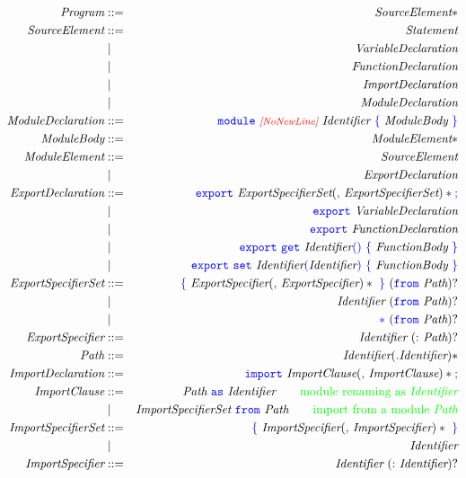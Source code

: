 \documentclass[a4paper]{article}
\newcommand{\Program}{\emph{Program}}
\newcommand{\SourceElement}{\emph{SourceElement}}
\newcommand{\Statement}{\emph{Statement}}
\newcommand{\VariableDeclaration}{\emph{VariableDeclaration}}
\newcommand{\FunctionDeclaration}{\emph{FunctionDeclaration}}
\newcommand{\ModuleDeclaration}{\emph{ModuleDeclaration}}
\newcommand{\ModuleBody}{\emph{ModuleBody}}
\newcommand{\ModuleElement}{\emph{ModuleElement}}
\newcommand{\ExportDeclaration}{\emph{ExportDeclaration}}
\newcommand{\ExportSpecifierSet}{\emph{ExportSpecifierSet}}
\newcommand{\ExportSpecifier}{\emph{ExportSpecifier}}
\newcommand{\Path}{\emph{Path}}
\newcommand{\ImportDeclaration}{\emph{ImportDeclaration}}
\newcommand{\ImportClause}{\emph{ImportClause}}
\newcommand{\ImportSpecifierSet}{\emph{ImportSpecifierSet}}
\newcommand{\ImportSpecifier}{\emph{ImportSpecifier}}
\newcommand{\FunctionBody}{\emph{FunctionBody}}
\newcommand{\Identifier}{\emph{Identifier}}
\newcommand{\NoNewLine}{\emph{\textcolor{red}{\footnotesize [NoNewLine]}}}
\newcommand{\code}[1]{\textcolor{blue}{\tt #1}}
\newcommand{\cmodule}{\code{module}}
\newcommand{\cimport}{\code{import}}
\newcommand{\cexport}{\code{export}}
\newcommand{\cget}{\code{get}}
\newcommand{\cset}{\code{set}}
\newcommand{\cfrom}{\code{from}}
\newcommand{\cas}{\code{as}}
\newcommand{\clparen}{\code{(}}
\newcommand{\crparen}{\code{)}}
\newcommand{\clbracket}{\code{\{}}
\newcommand{\crbracket}{\code{\}}}
\newcommand{\comment}[1]{\mbox{\textcolor{green}{#1}}}
\begin{document}
\begin{eqnarray*}
\Program & ::=  & \SourceElement* \\
\SourceElement & ::=  & \Statement \\
               & \mid & \VariableDeclaration \\
               & \mid & \FunctionDeclaration \\
               & \mid & \ImportDeclaration \\
               & \mid & \ModuleDeclaration \\
\ModuleDeclaration & ::= & \cmodule\ \NoNewLine\ \Identifier\ \clbracket\ \ModuleBody\ \crbracket \\
\ModuleBody & ::= & \ModuleElement* \\
\ModuleElement & ::=  & \SourceElement \\
               & \mid & \ExportDeclaration \\
\ExportDeclaration & ::=  & \cexport\ \ExportSpecifierSet(\code{,}\ \ExportSpecifierSet)*\code{;} \\
                   & \mid & \cexport\ \VariableDeclaration \\
                   & \mid & \cexport\ \FunctionDeclaration \\
                   & \mid & \cexport\ \cget\ \Identifier\clparen\crparen\ \clbracket\ \FunctionBody\ \crbracket \\
                   & \mid & \cexport\ \cset\ \Identifier\clparen\Identifier\crparen\ \clbracket\ \FunctionBody\ \crbracket \\
\ExportSpecifierSet & ::=  & \clbracket\ \ExportSpecifier(\code{,}\ \ExportSpecifier)*\ \crbracket\ (\cfrom\ \Path)? \\
                    & \mid & \Identifier\ (\cfrom\ \Path)? \\
                    & \mid & \code{*}\ (\cfrom\ \Path)? \\
\ExportSpecifier & ::= & \Identifier\ (\code{:}\ \Path)? \\
\Path & ::= & \Identifier(\code{.}\Identifier)* \\
\ImportDeclaration & ::=  & \cimport\ \ImportClause(\code{,}\ \ImportClause)*\code{;} \\
\ImportClause & ::=  & \Path\ \cas\ \Identifier \qquad \comment{module renaming as $\Identifier$} \\
              & \mid & \ImportSpecifierSet\ \cfrom\ \Path \qquad \comment{import from a module $\Path$} \\
\ImportSpecifierSet & ::=  & \clbracket\ \ImportSpecifier(\code{,}\ \ImportSpecifier)*\ \crbracket \\
                    & \mid & \Identifier \\
\ImportSpecifier & ::= & \Identifier\ (\code{:}\ \Identifier)?
\end{eqnarray*}
\end{document}
